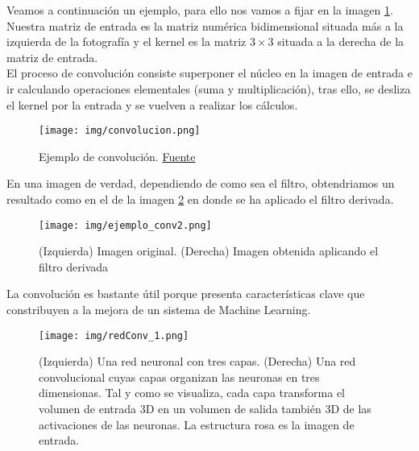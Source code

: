     
    \begin{ejemplo}
    
    Veamos a continuación un ejemplo, para ello nos vamos a fijar en la imagen \ref{fig:ejemplo_conv}. Nuestra matriz de entrada es la matriz numérica bidimensional situada más a la izquierda de la fotografía y el kernel es la matriz $3\times 3$ situada a la derecha de la matriz de entrada. \\
    
    El proceso de convolución consiste superponer el núcleo en la imagen de entrada e ir calculando operaciones elementales (suma y multiplicación), tras ello, se desliza el kernel por la entrada y se vuelven a realizar los cálculos.
    
    \begin{figure}[H]
        \centering
        \texttt{[image: img/convolucion.png]}
        \caption{Ejemplo de convolución. \href{https://medium.com/@bdhuma/6-basic-things-to-know-about-convolution-daef5e1bc411}{Fuente}}
        \label{fig:ejemplo_conv}
    \end{figure}
    
    
    En una imagen de verdad, dependiendo de como sea el filtro, obtendriamos un resultado como en el de la imagen \ref{fig:ejemplo_conv2} en donde se ha aplicado el filtro derivada.
    
    \begin{figure}[H]
        \centering
        \texttt{[image: img/ejemplo\_conv2.png]}
        \caption{(Izquierda) Imagen original. (Derecha) Imagen obtenida aplicando el filtro derivada}
        \label{fig:ejemplo_conv2}
    \end{figure}
    
    
    \end{ejemplo}
    
    
    La convolución es bastante útil porque presenta características clave que constribuyen a la mejora de un sistema de Machine Learning. 
    
    \begin{figure}[H]
        \centering
        \texttt{[image: img/redConv\_1.png]}
        \caption{(Izquierda) Una red neuronal con tres capas. (Derecha) Una red convolucional cuyas capas organizan las neuronas en tres dimensionas. Tal y como se visualiza, cada capa transforma el volumen de entrada $3$D en un volumen de salida también $3$D de las activaciones de las neuronas. La estructura rosa es la imagen de entrada.}
        \label{fig:red_conv_1}
    \end{figure}



